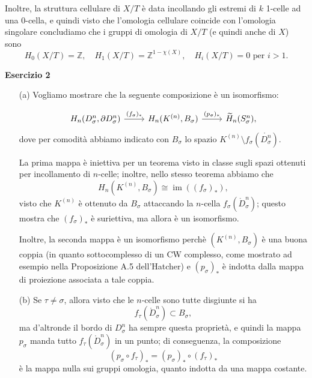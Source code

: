 \documentclass[a4paper]{article}
\newcommand{\Z}{\mathbb{Z}}
\newcommand{\im}{\operatorname{im}}
\theoremstyle{definition}
\theoremstyle{definition}
\theoremstyle{remark}
\theoremstyle{definition}
\begin{document}
\begin{itemize}
        Inoltre, la struttura cellulare di $X/T$ è data incollando gli estremi di $k$ 1-celle ad una 0-cella, e quindi visto che l'omologia cellulare coincide con l'omologia singolare concludiamo che i gruppi di omologia di $X/T$ (e quindi anche di $X$) sono
        \[
            H_0(X/T) = \Z, \quad H_1(X/T) = \Z^{1-\chi(X)}, \quad H_i(X/T) = 0 \text{ per } i>1.
        \]
\end{itemize}

\textbf{Esercizio 2}
\begin{itemize}
    \item[(a)] Vogliamo mostrare che la seguente composizione è un isomorfismo:

        \[
            \begin{tikzcd}
                H_n(D_\sigma^n,\partial D_\sigma^n) \arrow[r, "(f_\sigma)_*"] & H_n(K^{(n)},B_\sigma) \arrow[r, "(p_\sigma)_*"] & \widetilde{H}_n(S_\sigma^n),
            \end{tikzcd}
        \]
        dove per comodità abbiamo indicato con $B_\sigma$ lo spazio $K^{(n)}\setminus f_\sigma(\mathring{D_\sigma^n})$.

        La prima mappa è iniettiva per un teorema visto in classe sugli spazi ottenuti per incollamento di $n$-celle; inoltre, nello stesso teorema abbiamo che
        \[
            H_n(K^{(n)},B_\sigma) \cong \im{((f_\sigma)_*)},
        \]
        visto che $K^{(n)}$ è ottenuto da $B_\sigma$ attaccando la $n$-cella $f_\sigma(\mathring{D}_\sigma^n)$; questo mostra che $(f_\sigma)_*$ è suriettiva, ma allora è un isomorfismo.

        Inoltre, la seconda mappa è un isomorfismo perchè $(K^{(n)},B_\sigma)$ è una buona coppia (in quanto sottocomplesso di un CW complesso, come mostrato ad esempio nella Proposizione A.5 dell'Hatcher) e $(p_\sigma)_*$ è indotta dalla mappa di proiezione associata a tale coppia.

    \item[(b)] Se $\tau\neq \sigma$, allora visto che le $n$-celle sono tutte disgiunte si ha
        \[f_\tau(\mathring{D}_\sigma^n)\subset B_\sigma,\]
        ma d'altronde il bordo di $D_\sigma^n$ ha sempre questa proprietà, e quindi la mappa $p_\sigma$ manda tutto $f_\tau(\mathring{D}_\sigma^n)$ in un punto; di conseguenza, la composizione \[(p_\sigma\circ f_\tau)_* = (p_\sigma)_*\circ (f_\tau)_*\] è la mappa nulla sui gruppi omologia, quanto indotta da una mappa costante.
\end{itemize}
\end{document}
